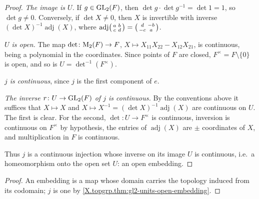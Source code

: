 \begin{theorem}
\end{theorem}
\begin{proof}
\emph{The image is $U$.} If $g\in\mathrm{GL}_2(F)$, then $\det g\cdot\det g^{-1}=\det1=1$, so $\det g\neq0$. Conversely,
if $\det X\neq0$, then $X$ is invertible with inverse $(\det X)^{-1}\operatorname{adj}(X)$, where
$\operatorname{adj}\begin{psmallmatrix}a&b\\c&d\end{psmallmatrix}=\begin{psmallmatrix}d&-b\\-c&a\end{psmallmatrix}$.

\emph{$U$ is open.} The map $\det\colon\mathrm{M}_2(F)\to F$, $X\mapsto X_{11}X_{22}-X_{12}X_{21}$, is continuous, being
a polynomial in the coordinates. Since points of $F$ are closed, $F^\times=F\setminus\{0\}$ is open, and so is
$U=\det^{-1}(F^\times)$.

\emph{$j$ is continuous}, since $j$ is the first component of $e$.

\emph{The inverse $r\colon U\to\mathrm{GL}_2(F)$ of $j$ is continuous.} By the conventions above it suffices that
$X\mapsto X$ and $X\mapsto X^{-1}=(\det X)^{-1}\operatorname{adj}(X)$ are continuous on $U$. The first is clear. For
the second, $\det\colon U\to F^\times$ is continuous, inversion is continuous on $F^\times$ by hypothesis, the entries
of $\operatorname{adj}(X)$ are $\pm$ coordinates of $X$, and multiplication in $F$ is continuous.

Thus $j$ is a continuous injection whose inverse on its image $U$ is continuous, i.e.\ a homeomorphism onto the open
set $U$: an open embedding.
\end{proof}

\begin{theorem}[units topology $=$ subspace topology]
\end{theorem}
\begin{proof}
An embedding is a map whose domain carries the topology induced from its codomain; $j$ is one by
\cref{X.topgrp.thm:gl2-units-open-embedding}.
\end{proof}

